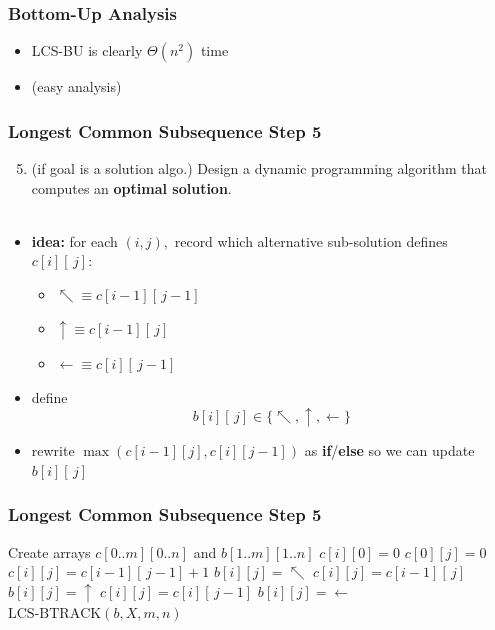 \documentclass[10pt,aspectratio=169]{beamer}
\newcommand{\stanza}{ \\~\ }
\begin{document}
\begin{frame} \frametitle{Bottom-Up Analysis}
  \begin{itemize}
    \item LCS-BU is clearly $\Theta(n^2)$ time
    \item (easy analysis)
  \end{itemize}
\end{frame}

\begin{frame} \frametitle{Longest Common Subsequence Step 5}
  \begin{enumerate}
    \setcounter{enumi}{4}
    \item (if goal is a solution algo.) Design a dynamic programming algorithm that computes an \textbf{optimal solution}.
    \stanza
  \end{enumerate}

  \begin{itemize}
    \item \textbf{idea:} for each $(i, j),$ record which alternative sub-solution defines $c[i][\, j]:$
      \begin{itemize}
        \item $\nwarrow \equiv c[i-1][\, j-1]$
        \item $\uparrow \equiv c[i-1][\, j]$
        \item $\leftarrow \equiv c[i][\, j - 1]$
      \end{itemize}
    \item define
      \[ b[i][\, j] \in \{ \nwarrow, \uparrow, \leftarrow \} \]
    \item rewrite $\max(c[i-1][j], c[i][j-1])$ as \textbf{if}/\textbf{else} so we can update $b[i][\, j]$
  \end{itemize}
\end{frame}

\begin{frame} \frametitle{Longest Common Subsequence Step 5}
  {\tiny
  \begin{algorithmic}[1]
    \State Create arrays $c[0..m][0..n]$ and $b[1..m][1..n]$ 
      \State $c[i][0] = 0$
    \EndFor
     
      \State $c[0][j] = 0$
    \EndFor
          \State $c[i][j] = c[i-1][\, j-1] + 1$
          \State $b[i][j] = \nwarrow$
          \State $c[i][j] = c[i-1][\, j]$
          \State $b[i][j] = \uparrow$
        \Else
        \State $c[i][j] = c[i][\, j-1]$
        \State $b[i][j] = \leftarrow$
      \EndIf
      \EndFor
    \EndFor
    \State \Return $\text{LCS-BTRACK}(b, X, m, n)$
    \EndFunction
  \end{algorithmic}
  }
\end{frame}
\end{document}
